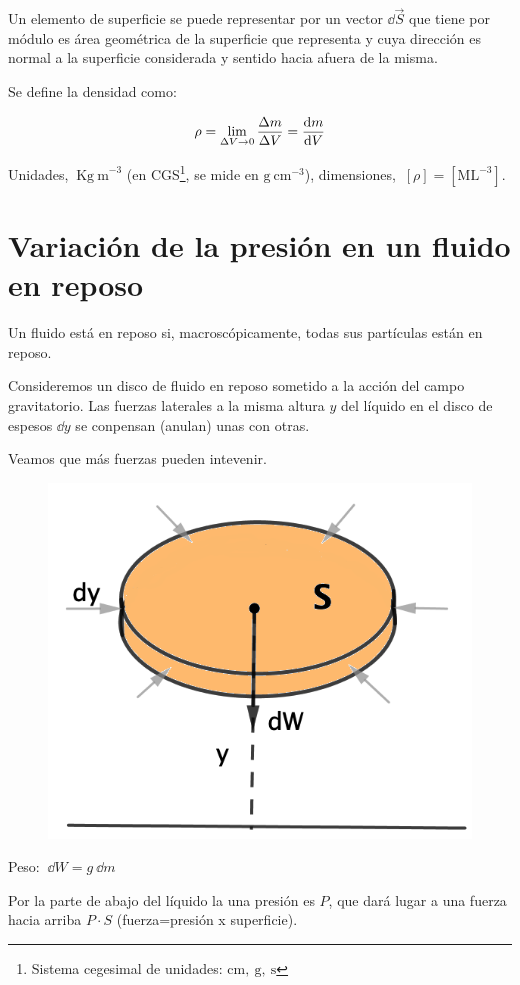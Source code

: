 Un elemento de superficie se puede representar por un vector $\dd \overrightarrow{S}$ que tiene por módulo es área geométrica de la superficie que representa y cuya dirección es normal a la superficie considerada y sentido hacia afuera de la misma.


Se define la densidad como:

\begin{equation}
\rho= \lim_{\Delta V \to 0}\dfrac{\Delta m}{\Delta V}=\dv{m}{V}	
\end{equation}

Unidades, $\ \mathrm{Kg\ m}^{-3}$ (en CGS\footnote{Sistema cegesimal de unidades: $\mathrm{cm,\ g,\ s}$}, se mide en $\mathrm{g \ cm}^{-3}$), dimensiones, $\ [\rho]=[\mathrm{ML}^{-3}]$.

\vspace{20mm} %
\section{Variación de la presión en un fluido en reposo}
\begin{multicols}{2}
Un fluido está en reposo si, macroscópicamente, todas sus partículas están en reposo.

Consideremos un disco de fluido en reposo sometido a la acción del campo gravitatorio. Las fuerzas laterales a la misma altura $y$ del líquido en el disco de espesos $\dd y$ se conpensan (anulan) unas con otras.

Veamos que más fuerzas pueden intevenir.

\begin{figure}[H]
	\centering
	\includegraphics[width=.55\textwidth]{imagenes/imagenes07/T07IM03.png}
\end{figure}
\end{multicols}


Peso: $\ \dd W=g\ \dd m$

Por la parte de abajo del líquido la una presión es $P$, que dará lugar a una fuerza hacia arriba $P\cdot S$ \textcolor{gris}{(fuerza=presión x superficie)}.

